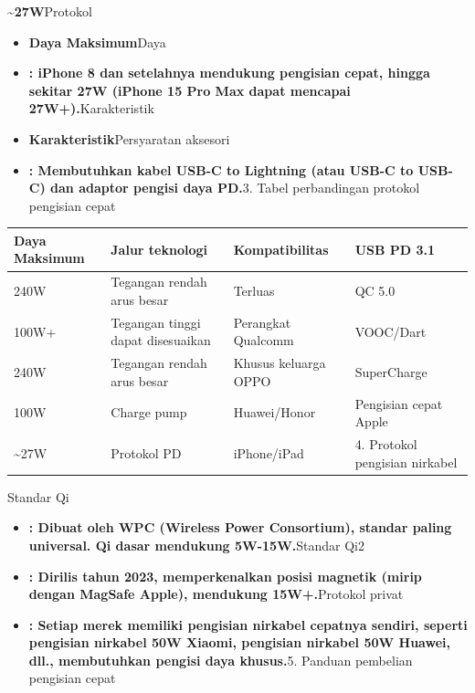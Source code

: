 \textbf{\textasciitilde{}27W}Protokol

\begin{itemize}
  \item \textbf{Daya Maksimum}Daya
  \item \textbf{: iPhone 8 dan setelahnya mendukung pengisian cepat, hingga sekitar 27W (iPhone 15 Pro Max dapat mencapai 27W+).}Karakteristik
  \item \textbf{Karakteristik}Persyaratan aksesori
  \item \textbf{: Membutuhkan kabel USB-C to Lightning (atau USB-C to USB-C) dan adaptor pengisi daya PD.}3. Tabel perbandingan protokol pengisian cepat
\end{itemize}


\begin{center}
\begin{tabularx}{\linewidth}{|X|X|X|X|}
\hline
\textbf{Daya Maksimum} & \textbf{Jalur teknologi} & \textbf{Kompatibilitas} & \textbf{USB PD 3.1} \tabularnewline
\hline
240W & Tegangan rendah arus besar & Terluas & QC 5.0 \tabularnewline
100W+ & Tegangan tinggi dapat disesuaikan & Perangkat Qualcomm & VOOC/Dart \tabularnewline
240W & Tegangan rendah arus besar & Khusus keluarga OPPO & SuperCharge \tabularnewline
100W & Charge pump & Huawei/Honor & Pengisian cepat Apple \tabularnewline
\textasciitilde{}27W & Protokol PD & iPhone/iPad & 4. Protokol pengisian nirkabel \tabularnewline
\hline
\end{tabularx}
\end{center}


Standar Qi

\begin{itemize}
  \item \textbf{: Dibuat oleh WPC (Wireless Power Consortium), standar paling universal. Qi dasar mendukung 5W-15W.}Standar Qi2
  \item \textbf{: Dirilis tahun 2023, memperkenalkan posisi magnetik (mirip dengan MagSafe Apple), mendukung 15W+.}Protokol privat
  \item \textbf{: Setiap merek memiliki pengisian nirkabel cepatnya sendiri, seperti pengisian nirkabel 50W Xiaomi, pengisian nirkabel 50W Huawei, dll., membutuhkan pengisi daya khusus.}5. Panduan pembelian pengisian cepat
\end{itemize}

